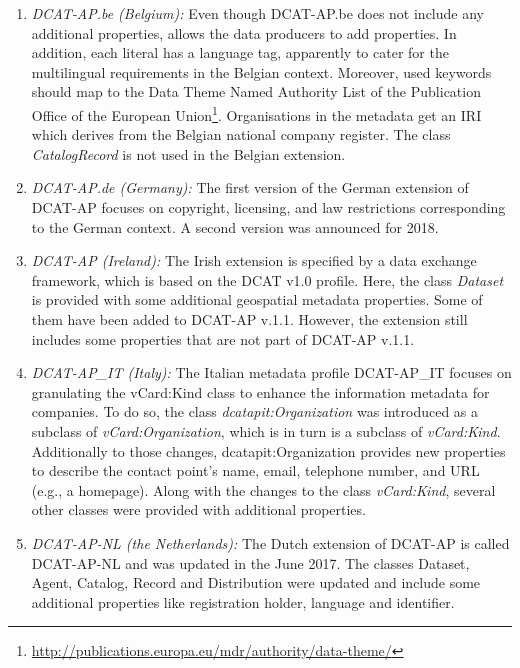 \documentclass[<options>]{elsarticle}
\begin{document}
\begin{enumerate}
\item \textit{DCAT-AP.be (Belgium):} Even though DCAT-AP.be does not include any additional properties, allows the data producers to add properties. In addition, each literal has a language tag, apparently to cater for the multilingual requirements in the Belgian context. Moreover, used keywords should map to the Data Theme Named Authority List of the Publication Office of the European Union\footnote{\href{http://publications.europa.eu/mdr/authority/data-theme/}{http://publications.europa.eu/mdr/authority/data-theme/}}. Organisations in the metadata
% 
get an IRI which derives from the Belgian national company register. The class \textit{CatalogRecord} is not used in the Belgian extension.

\item \textit{DCAT-AP.de (Germany):} The first version of the German extension of DCAT-AP focuses on copyright, licensing, and law restrictions corresponding to the German context. A second version was announced for 2018.

\item \textit{DCAT-AP (Ireland):} The Irish extension is specified by a data exchange framework, which is based on the DCAT v1.0 profile. Here, the class \textit{Dataset} is provided with some additional geospatial metadata properties. Some of them have been added to DCAT-AP v.1.1. However, the extension still includes some properties that are not part of DCAT-AP v.1.1.

\item \textit{DCAT-AP\_IT (Italy):} The Italian metadata profile DCAT-AP\_IT focuses on granulating the vCard:Kind class to enhance the information metadata for companies. To do so, the class \textit{dcatapit:Organization} was introduced as a subclass of \textit{vCard:Organization}, which is in turn is a subclass of \textit{vCard:Kind}. Additionally to those changes, dcatapit:Organization provides new properties to describe the contact point’s name, email,  telephone number, and URL (e.g., a homepage). Along with the changes to the class \textit{vCard:Kind}, several other classes were provided with additional properties.

\item \textit{DCAT-AP-NL (the Netherlands):} The Dutch extension of DCAT-AP is called DCAT-AP-NL and was updated in the June 2017. The classes Dataset, Agent, Catalog, Record and Distribution were updated and include some additional properties like registration holder, language and identifier. 


\end{enumerate}
\end{document}
